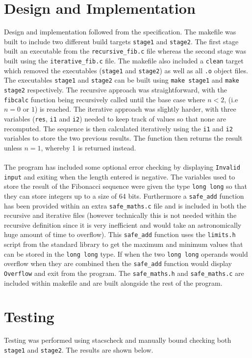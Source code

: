 \documentclass{article}
\begin{document}
\section{Design and Implementation}
Design and implementation followed from the specification. The makefile was built to include two different build targets \verb+stage1+ and \verb+stage2+. The first stage built an executable from the \verb+recursive_fib.c+ file whereas the second stage was built using the \verb+iterative_fib.c+ file. The makefile also included a \verb+clean+ target which removed the executables (\verb+stage1+ and \verb+stage2+) as well as all \verb+.o+ object files. The executables \verb+stage1+ and \verb+stage2+ can be built using \verb+make stage1+ and \verb+make stage2+ respectively. The recursive approach was straightforward, with the \verb+fibcalc+ function being recursively called until the base case where $n < 2$, (i.e $n = 0$ or $1$) is reached. The iterative approach was slightly harder, with three variables (\verb+res+, \verb+i1+ and \verb+i2+) needed to keep track of values so that none are recomputed. The sequence is then calculated iteratively using the \verb+i1+ and \verb+i2+ variables to store the two previous results. The function then returns the result unless $n = 1$, whereby 1 is returned instead. \\ \\ \noindent The program has included some optional error checking by displaying \verb+Invalid input+ and exiting when the length entered is negative. The variables used to store the result of the Fibonacci sequence were given the type \verb+long long+ so that they can store integers up to a size of 64 bits. Furthermore a \verb+safe_add+ function has been provided within an extra \verb+safe_maths.c+ file and is included in both the recursive and iterative files (however technically this is not needed within the recursive definition since it is very inefficient and would take an astronomically huge amount of time to overflow). This \verb+safe_add+ function uses the \verb+limits.h+ script from the standard library to get the maximum and minimum values that can be stored in the \verb+long long+ type. If when the two \verb+long long+ operands would overflow when they are combined then the \verb+safe_add+ function would display \verb+Overflow+ and exit from the program. The \verb+safe_maths.h+ and \verb+safe_maths.c+ are included within makefile and are built alongside the rest of the program.

\section{Testing}
Testing was performed using stacscheck and manually bound checking both \verb+stage1+ and \verb+stage2+. The results are shown below.
\end{document}
